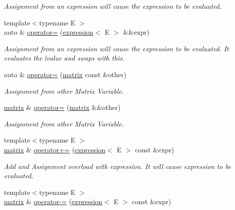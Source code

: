 \begin{DoxyCompactItemize}
\begin{DoxyCompactList}\small\item\em Assignment from an expression will cause the expression to be evaluated. \end{DoxyCompactList}\item 
{\footnotesize template$<$typename E $>$ }\\auto \& \mbox{\hyperlink{classtest_1_1matrix_a2451869ee60cb1642d730aeacbef0e06}{operator=}} (\mbox{\hyperlink{classtest_1_1expression}{expression}}$<$ E $>$ \&\&expr)
\begin{DoxyCompactList}\small\item\em Assignment from an expression will cause the expression to be evaluated. It evaluates the lvalue and swaps with this. \end{DoxyCompactList}\item 
auto \& \mbox{\hyperlink{classtest_1_1matrix_ae4e2d18c1244f4c163181cc30c72a5b7}{operator=}} (\mbox{\hyperlink{classtest_1_1matrix}{matrix}} const \&other)
\begin{DoxyCompactList}\small\item\em Assignment from other Matrix Variable. \end{DoxyCompactList}\item 
\mbox{\hyperlink{classtest_1_1matrix}{matrix}} \& \mbox{\hyperlink{classtest_1_1matrix_ad0cf3573578dc69c13400be5c158c1fc}{operator=}} (\mbox{\hyperlink{classtest_1_1matrix}{matrix}} \&\&other)
\begin{DoxyCompactList}\small\item\em Assignment from other Matrix Variable. \end{DoxyCompactList}\item 
{\footnotesize template$<$typename E $>$ }\\\mbox{\hyperlink{classtest_1_1matrix}{matrix}} \& \mbox{\hyperlink{classtest_1_1matrix_acacdf5c7f4c7c687691b8daf03d1821d}{operator+=}} (\mbox{\hyperlink{classtest_1_1expression}{expression}}$<$ E $>$ const \&expr)
\begin{DoxyCompactList}\small\item\em Add and Assignment overload with expression. It will cause expression to be evaluated. \end{DoxyCompactList}\item 
{\footnotesize template$<$typename E $>$ }\\\mbox{\hyperlink{classtest_1_1matrix}{matrix}} \& \mbox{\hyperlink{classtest_1_1matrix_a3bc463949a4ca9267e6ca9c23fabb9e8}{operator-\/=}} (\mbox{\hyperlink{classtest_1_1expression}{expression}}$<$ E $>$ const \&expr)

\end{DoxyCompactItemize}
